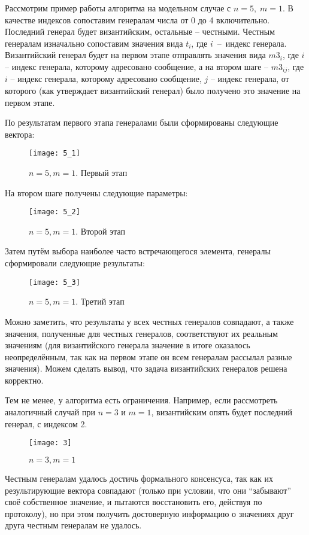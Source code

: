 Рассмотрим пример работы алгоритма на модельном случае с $n = 5, \; m = 1$. В качестве индексов сопоставим генералам числа от 0 до 4 включительно. Последний генерал будет византийским, остальные -- честными. Честным генералам изначально сопоставим значения вида $t_i$, где $i$ -- индекс генерала. Византийский генерал будет на первом этапе отправлять значения вида $m3_i$, где $i$ -- индекс генерала, которому адресовано сообщение, а на втором шаге -- $m3_{ij}$, где $i$ -- индекс генерала, которому адресовано сообщение, $j$ -- индекс генерала, от которого (как утверждает византийский генерал) было получено это значение на первом этапе.

По результатам первого этапа генералами были сформированы следующие вектора:

\begin{figure}[H]
	\begin{center}
		\texttt{[image: 5\_1]}
		\caption{$n = 5, m = 1$. Первый этап}
	\end{center}
\end{figure}

На втором шаге получены следующие параметры:

\begin{figure}[H]
	\begin{center}
		\texttt{[image: 5\_2]}
		\caption{$n = 5, m = 1$. Второй этап}
	\end{center}
\end{figure}

Затем путём выбора наиболее часто встречающегося элемента, генералы сформировали следующие результаты:

\begin{figure}[H]
	\begin{center}
		\texttt{[image: 5\_3]}
		\caption{$n = 5, m = 1$. Третий этап}
	\end{center}
\end{figure}

Можно заметить, что результаты у всех честных генералов совпадают, а также значения, полученные для честных генералов, соответствуют их реальным значениям (для византийского генерала значение в итоге оказалось неопределённым, так как на первом этапе он всем генералам рассылал разные значения). Можем сделать вывод, что задача византийских генералов решена корректно.

Тем не менее, у алгоритма есть ограничения. Например, если рассмотреть аналогичный случай при $n = 3$ и $m = 1$, византийским опять будет последний генерал, с индексом 2. 

\begin{figure}[H]
	\begin{center}
		\texttt{[image: 3]}
		\caption{$n = 3, m = 1$}
	\end{center}
\end{figure}

Честным генералам удалось достичь формального консенсуса, так как их результирующие вектора совпадают (только при условии, что они ``забывают'' своё собственное значение, и пытаются восстановить его, действуя по протоколу), но при этом получить достоверную информацию о значениях друг друга честным генералам не удалось.
